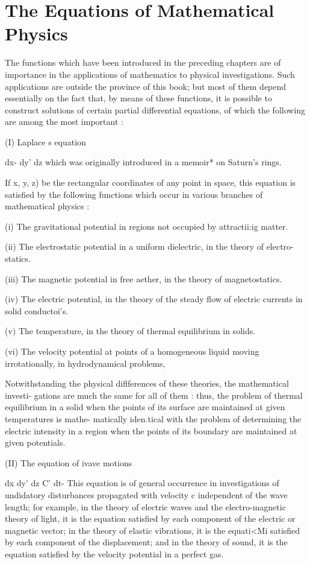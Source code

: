 %
%
\chapter{The Equations of Mathematical Physics}


The functions which have been introduced in the preceding chapters are
of importance in the applications of mathematics to physical
investigations. Such applications are outside the province of this
book; but most of them depend essentially on the fact that, by means
of these functions, it is possible to construct solutions of certain
partial differential equations, of which the following are among the
most important :

(I) Laplace s equation

dx- dy' dz which was originally introduced in a memoir* on Saturn's
rings.

If x, y, z) be the rectangular coordinates of any point in space, this
equation is satisfied by the following functions which occur in
various branches of mathematical physics :

(i) The gravitational potential in regions not occupied by
attractii:ig matter.

(ii) The electrostatic potential in a uniform dielectric, in the
theory of electro- statics.

(iii) The magnetic potential in free aether, in the theory of
magnetostatics.

(iv) The electric potential, in the theory of the steady flow of
electric currents in solid conductoi's.

(v) The temperature, in the theory of thermal equilibrium in solids.

(vi) The velocity potential at points of a homogeneous liquid moving
irrotationally, in hydrodynamical problems,

Notwithstanding the physical diflferences of these theories, the
mathematical investi- gations are much the same for all of them :
thus, the problem of thermal equilibrium in a solid when the points of
its surface are maintained at given temperatures is mathe- matically
iden.tical with the problem of determining the electric intensity in a
region when the points of its boundary are maintained at given
potentials.

(II) The equation of ivave motions

dx dy' dz C' dt- This equation is of general occurrence in
investigations of undidatory disturbances propagated with velocity c
independent of the wave length; for example, in the theory of
electric waves and the electro-magnetic theory of light, it is the
equation satisfied by each component of the electric or magnetic
vector; in the theory of elastic vibrations, it is the equati<Mi
satisfied by each component of the displacement; and in the theory of
sound, it is the equation satisfied by the velocity potential in a
perfect gas.

